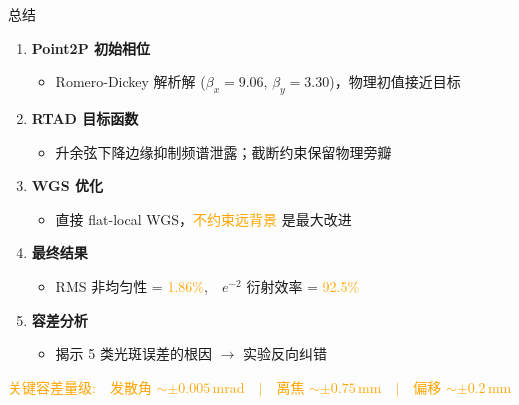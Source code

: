 \documentclass[10pt,aspectratio=43]{beamer}
\newcommand{\orange}[1]{\textcolor{orange}{#1}}
\begin{document}
\begin{frame}{总结}
  \begin{enumerate}
    \item \textbf{Point2P 初始相位}
    \begin{itemize}
      \item Romero-Dickey 解析解 ($\beta_x=9.06$, $\beta_y=3.30$)，物理初值接近目标
    \end{itemize}

    \item \textbf{RTAD 目标函数}
    \begin{itemize}
      \item 升余弦下降边缘抑制频谱泄露；截断约束保留物理旁瓣
    \end{itemize}

    \item \textbf{WGS 优化}
    \begin{itemize}
      \item 直接 flat-local WGS，\orange{不约束远背景} 是最大改进
    \end{itemize}

    \item \textbf{最终结果}
    \begin{itemize}
      \item RMS 非均匀性 = \orange{1.86\%},~~$e^{-2}$ 衍射效率 = \orange{92.5\%}
    \end{itemize}

    \item \textbf{容差分析}
    \begin{itemize}
      \item 揭示 5 类光斑误差的根因 $\to$ 实验反向纠错
    \end{itemize}
  \end{enumerate}

  \vspace{0.05cm}
  \begin{center}
    \footnotesize
    \orange{关键容差量级:~~发散角 $\sim\pm 0.005$\,mrad~~$|$~~离焦 $\sim\pm 0.75$\,mm~~$|$~~偏移 $\sim\pm 0.2$\,mm}
  \end{center}
\end{frame}
\end{document}
